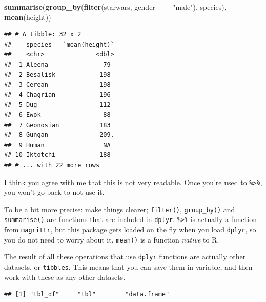 \documentclass[]{gitbook}
\newenvironment{Shaded}{\begin{snugshade}}{\end{snugshade}}
\newcommand{\KeywordTok}[1]{\textcolor[rgb]{0.13,0.29,0.53}{\textbf{#1}}}
\newcommand{\NormalTok}[1]{#1}
\newcommand{\OperatorTok}[1]{\textcolor[rgb]{0.81,0.36,0.00}{\textbf{#1}}}
\newcommand{\StringTok}[1]{\textcolor[rgb]{0.31,0.60,0.02}{#1}}
\theoremstyle{definition}
\theoremstyle{definition}
\theoremstyle{definition}
\theoremstyle{remark}
\begin{document}
\begin{Shaded}
\begin{Highlighting}[]
\KeywordTok{summarise}\NormalTok{(}\KeywordTok{group_by}\NormalTok{(}\KeywordTok{filter}\NormalTok{(starwars, gender }\OperatorTok{==}\StringTok{ "male"}\NormalTok{), species), }\KeywordTok{mean}\NormalTok{(height))}
\end{Highlighting}
\end{Shaded}

\begin{verbatim}
## # A tibble: 32 x 2
##    species   `mean(height)`
##    <chr>              <dbl>
##  1 Aleena               79 
##  2 Besalisk            198 
##  3 Cerean              198 
##  4 Chagrian            196 
##  5 Dug                 112 
##  6 Ewok                 88 
##  7 Geonosian           183 
##  8 Gungan              209.
##  9 Human                NA 
## 10 Iktotchi            188 
## # ... with 22 more rows
\end{verbatim}

I think you agree with me that this is not very readable. Once you're
used to \texttt{\%\textgreater{}\%}, you won't go back to not use it.

To be a bit more precise: make things clearer; \texttt{filter()},
\texttt{group\_by()} and \texttt{summarise()} are functions that are
included in \texttt{dplyr}. \texttt{\%\textgreater{}\%} is actually a
function from \texttt{magrittr}, but this package gets loaded on the fly
when you load \texttt{dplyr}, so you do not need to worry about it.
\texttt{mean()} is a function \emph{native} to R.

The result of all these operations that use \texttt{dplyr} functions are
actually other datasets, or \texttt{tibbles}. This means that you can
save them in variable, and then work with these as any other datasets.

\begin{Shaded}
\end{Shaded}

\begin{verbatim}
## [1] "tbl_df"     "tbl"        "data.frame"
\end{verbatim}
\end{document}
